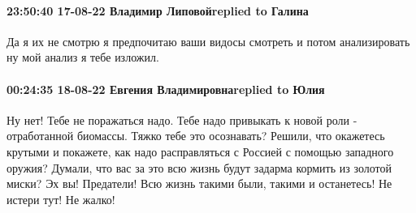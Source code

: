  
 
 
 
 

\paragraph{23:50:40 17-08-22 Владимир Липовойreplied to Галина}

Да я их не смотрю я предпочитаю ваши видосы смотреть и потом анализировать ну
мой анализ я тебе изложил.

\paragraph{00:24:35 18-08-22 Евгения Владимировнаreplied to Юлия}

Ну нет! Тебе не поражаться надо. Тебе надо привыкать к новой роли -
отработанной биомассы. Тяжко тебе это осознавать? Решили, что окажетесь крутыми
и покажете, как надо расправляться с Россией с помощью западного оружия?
Думали, что вас за это всю жизнь будут задарма кормить из золотой миски? Эх вы!
Предатели! Всю жизнь такими были, такими и останетесь! Не истери тут! Не жалко!
